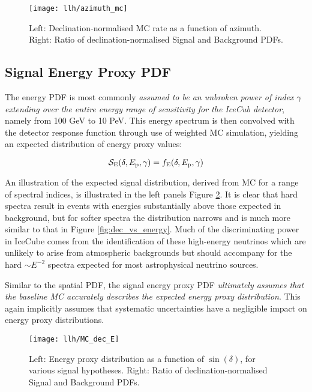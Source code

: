 \begin{figure}[!ht]
	\centering \texttt{[image: llh/azimuth\_mc]}
	\caption{Left: Declination-normalised MC rate as a function of azimuth. Right: Ratio of declination-normalised Signal and Background PDFs.}
	\label{fig:azimuth_mc}
\end{figure}

\subsection{Signal Energy Proxy PDF}

The energy PDF is most commonly \emph{assumed to be an unbroken power of index $\gamma$ extending over the entire energy range of sensitivity for the IceCub detector}, namely from 100 GeV to 10 PeV. This energy spectrum is then convolved with the detector response function through use of weighted MC simulation, yielding an expected distribution of energy proxy values:

\begin{equation}
\mathcal{S}_{\textup{E}} (\delta, E_{\textup{p}}, \gamma) = f_{\textup{E}}(\delta, E_{\textup{p}}, \gamma)
\label{eq:s_energy}
\end{equation}

An illustration of the expected signal distribution, derived from MC for a range of spectral indices, is illustrated in the left panels Figure \ref{fig:mc_dec_e}. It is clear that hard spectra result in events with energies substantially above those expected in background, but for softer spectra the distribution narrows and is much more similar to that in Figure \ref{fig:dec_vs_energy}. Much of the discriminating power in IceCube comes from the identification of these high-energy neutrinos which are unlikely to arise from atmospheric backgrounds but should accompany for the hard $\sim E^{-2}$ spectra expected for most astrophysical neutrino sources. 

Similar to the spatial PDF, the signal energy proxy PDF \emph{ultimately assumes that the baseline MC accurately describes the expected energy proxy distribution}. This again implicitly assumes that systematic uncertainties have a negligible impact on energy proxy distributions. 

\begin{figure}[!ht]
	\centering \texttt{[image: llh/MC\_dec\_E]}
	\caption{Left: Energy proxy distribution as a function of $\sin(\delta)$, for various signal hypotheses. Right: Ratio of declination-normalised Signal and Background PDFs.}
	\label{fig:mc_dec_e}
\end{figure}

